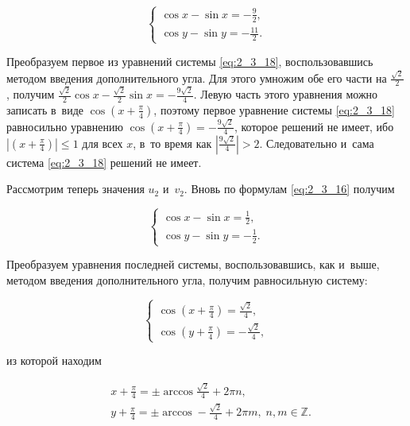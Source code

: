 \begin{equation}\label{eq:2_3_18}
\begin{cases}
\displaystyle \cos x - \sin x = -\frac{9}{2}, \\
\displaystyle \cos y - \sin y = -\frac{11}{2}.
\end{cases}
\end{equation}

\noindent
Преобразуем первое из уравнений системы \eqref{eq:2_3_18}, воспользовавшись
методом введения дополнительного угла. Для этого умножим обе его части на
$\displaystyle \frac{\sqrt{2}}{2}$, получим 
$\displaystyle \frac{\sqrt{2}}{2} \cos x - \frac{\sqrt{2}}{2} \sin x = -\frac{9\sqrt{2}}{4}$.
Левую часть этого уравнения можно записать в~виде
$\displaystyle \cos \left( x + \frac{\pi}{4} \right)$, поэтому первое уравнение системы
\eqref{eq:2_3_18} равносильно уравнению
$\displaystyle \cos \left( x + \frac{\pi}{4} \right) = -\frac{9\sqrt{2}}{4}$,
которое решений не имеет, ибо
$\displaystyle \left | \left( x + \frac{\pi}{4} \right) \right | \leqslant 1$
для всех $x$, в~то время как $\displaystyle \left | \frac{9\sqrt{2}}{4} \right | > 2$.
Следовательно и~сама система \eqref{eq:2_3_18} решений не имеет.

Рассмотрим теперь значения $u_{2}$ и~$v_{2}$. Вновь по формулам \eqref{eq:2_3_16}
получим

\begin{equation*}
\begin{cases}
\displaystyle \cos x - \sin x = \frac{1}{2}, \\[10pt]
\displaystyle \cos y - \sin y = -\frac{1}{2}.
\end{cases}
\end{equation*}

\noindent
Преобразуем уравнения последней системы, воспользовавшись, как и~выше,
методом введения дополнительного угла, получим равносильную систему:

\begin{equation*}
\begin{cases}
\displaystyle \cos \left( x + \frac{\pi}{4} \right) = \frac{\sqrt{2}}{4}, \\[10pt]
\displaystyle \cos \left( y + \frac{\pi}{4} \right) = - \frac{\sqrt{2}}{4},
\end{cases}
\end{equation*}

\noindent
из которой находим

\begin{align*}
& x + \frac{\pi}{4} = \pm \arccos \frac{\sqrt{2}}{4} + 2\pi n, \\[10pt]
& y + \frac{\pi}{4} = \pm \arccos -\frac{\sqrt{2}}{4} + 2\pi m, \; n, m \in \mathbb{Z}.
\end{align*}


